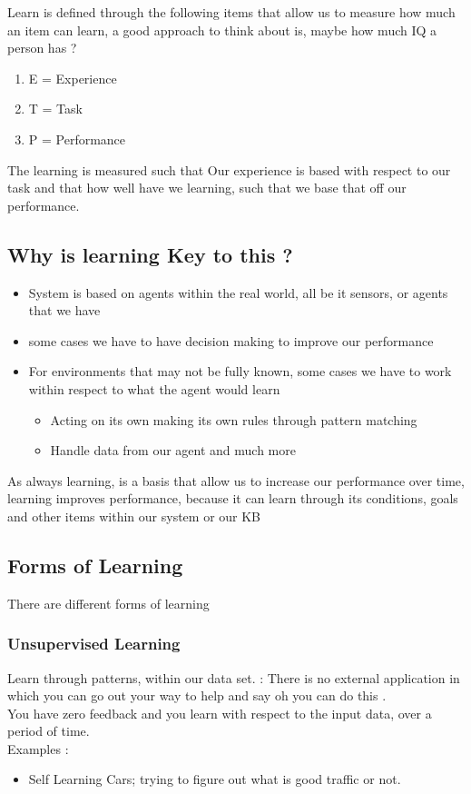 \documentclass{article}
\theoremstyle{mytheoremstyle}
\theoremstyle{mytheoremstyle}
\theoremstyle{myproblemstyle}
\begin{document}
\begin{definition}[Learning]
	Learn is defined through the following items that allow us to measure how much an item can learn, a good approach to think about is, maybe how much IQ a person has ?
	\begin{enumerate}
		\item E = Experience
		\item T = Task
		\item P = Performance
	\end{enumerate}

	The learning is measured such that Our experience is based with respect to our task and that how well have we learning, such that we base that off our performance.
\end{definition}
\subsection{Why is learning Key to this ? }
\begin{itemize}
	\item System is based on agents within the real world, all be it sensors, or agents that we have
	\item some cases we have to have decision making to improve our performance
	\item For environments that may not be fully known, some cases we have to work within respect to what the agent would learn
	      \begin{itemize}
		      \item Acting on its own
		            \teim making its own rules through pattern matching
		      \item Handle data from our agent and much more
	      \end{itemize}
\end{itemize}

As always learning, is a basis that allow us to increase our performance over time, learning improves performance, because it can learn through its conditions, goals and other items within our system or our KB
\subsection{Forms of Learning}
There are different forms of learning
\subsubsection{Unsupervised Learning}
\begin{definition}
	Learn through patterns, within our data set. : There is no external application in which you can go out your way to help and say oh you can do this . \\
	You have zero feedback and you learn with respect to the input data, over a period of time.
	\\
	Examples :
	\\
	\begin{itemize}
		\item Self Learning Cars; trying to figure out what is good traffic or not.
	\end{itemize}

\end{definition}
\end{document}
